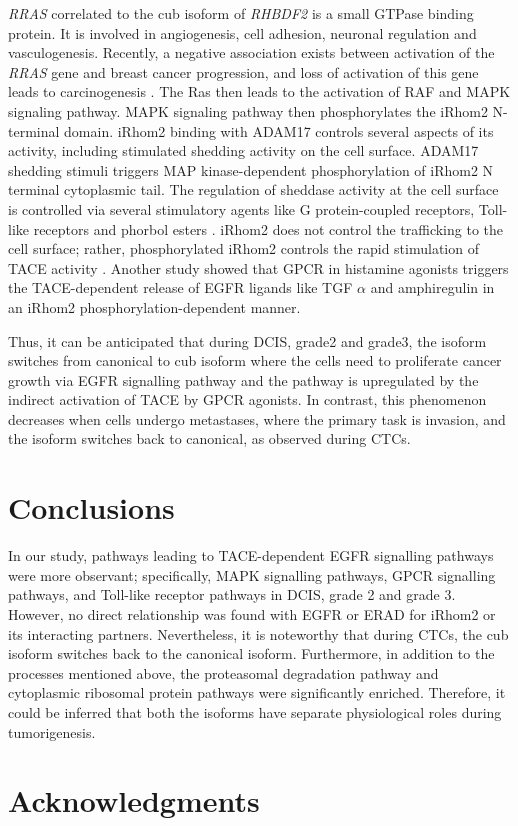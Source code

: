 \documentclass[fleqn,10pt,lineno]{wlpeerj}
\begin{document}
\textit{RRAS} correlated to the cub isoform of \textit{RHBDF2} is a small GTPase binding protein. It is involved in angiogenesis, cell adhesion, neuronal regulation and vasculogenesis. Recently, a negative association exists between activation of the \textit{RRAS} gene and breast cancer progression, and loss of activation of this gene leads to carcinogenesis \citep{Song2014}. The Ras then leads to the activation of RAF and MAPK signaling pathway. MAPK signaling pathway then phosphorylates the iRhom2 N-terminal domain. iRhom2 binding with ADAM17 controls several aspects of its activity, including stimulated shedding activity on the cell surface. ADAM17 shedding stimuli triggers MAP kinase-dependent phosphorylation of iRhom2 N terminal cytoplasmic tail. The regulation of sheddase activity at the cell surface is controlled via several stimulatory agents like G protein-coupled receptors, Toll-like receptors and phorbol esters \citep{Cavadas2017,Bleibaum2019}. iRhom2 does not control the trafficking to the cell surface; rather, phosphorylated iRhom2 controls the rapid stimulation of TACE activity \citep{Lee2016}. Another study showed that GPCR in histamine agonists triggers the TACE-dependent release of EGFR ligands like TGF $\alpha$ and amphiregulin in an iRhom2 phosphorylation-dependent manner\citep{Grieve2017}. 

Thus, it can be anticipated that during DCIS, grade2 and grade3, the isoform switches from canonical to cub isoform where the cells need to proliferate cancer growth via EGFR signalling pathway and the pathway is upregulated by the indirect activation of TACE by GPCR agonists. In contrast, this phenomenon decreases when cells undergo metastases, where the primary task is invasion, and the isoform switches back to canonical, as observed during CTCs.
 
\section*{Conclusions}

In our study, pathways leading to TACE-dependent EGFR signalling pathways were more observant; specifically, MAPK signalling pathways, GPCR signalling pathways, and Toll-like receptor pathways in DCIS, grade 2 and grade 3. However, no direct relationship was found with EGFR or ERAD for iRhom2 or its interacting partners. Nevertheless, it is noteworthy that during CTCs, the cub isoform switches back to the canonical isoform. Furthermore, in addition to the processes mentioned above, the proteasomal degradation pathway and cytoplasmic ribosomal protein pathways were significantly enriched. Therefore, it could be inferred that both the isoforms have separate physiological roles during tumorigenesis. 

\section*{Acknowledgments}


\end{document}
